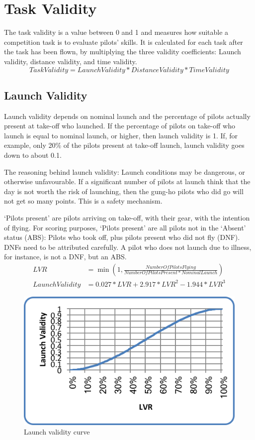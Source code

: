 \documentclass{article}
\begin{document}
\newpage
\section{Task Validity}
\label{sec:task-validity}
The task validity is a value between 0 and 1 and measures how suitable
a competition task is to evaluate pilots’ skills. It is calculated for each
task after the task has been flown, by multiplying the three validity
coefficients: Launch validity, distance validity, and time validity.
\begin{equation*}
    TaskValidity = LaunchValidity * DistanceValidity * TimeValidity
\end{equation*}

\subsection{Launch Validity}
\label{sec:launch-validity}
Launch validity depends on nominal launch and the percentage of pilots actually
present at take-off who launched. If the percentage of pilots on take-off who
launch is equal to nominal launch, or higher, then launch validity is 1. If,
for example, only 20\% of the pilots present at take-off launch, launch
validity goes down to about 0.1.

The reasoning behind launch validity: Launch conditions may be dangerous, or
otherwise unfavourable.  If a significant number of pilots at launch think that
the day is not worth the risk of launching, then the gung-ho pilots who did go
will not get so many points. This is a safety mechanism.

‘Pilots present’ are pilots arriving on take-off, with their gear, with the
intention of flying. For scoring purposes, ‘Pilots present’ are all pilots not
in the ‘Absent’ status (ABS): Pilots who took off, plus pilots present who did
not fly (DNF). DNFs need to be attributed carefully. A pilot who does not
launch due to illness, for instance, is not a DNF, but an ABS.
\begin{align*}
    LVR &= \min(1, \frac{NumberOfPilotsFlying}{NumberOfPilotsPresent * NominalLaunch}) \\
    LaunchValidity &= 0.027 * LVR + 2.917 * LVR^2 - 1.944 * LVR^3
\end{align*}

\begin{figure}[h!]
    \centering
    \includegraphics{img/launch-validity.png}
    \caption{Launch validity curve}
\end{figure}
\end{document}
